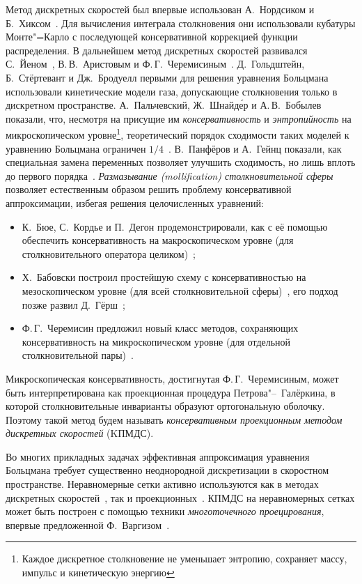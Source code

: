 Метод дискретных скоростей был впервые использован А.~Нордсиком и Б.~Хиксом~\autocite{Nordsieck1966}.
Для вычисления интеграла столкновения они использовали кубатуры Монте"=Карло
с последующей консервативной коррекцией функции распределения.
В дальнейшем метод дискретных скоростей развивался С.~Йеном~\autocite{Yen1984},
В.\,В.~Аристовым и Ф.\,Г.~Черемисиным~\autocite{Tcheremissine1980}.
Д.~Гольдштейн, Б.~Стёртевант и Дж.~Бродуелл первыми для решения уравнения Больцмана использовали
кинетические модели газа, допускающие столкновения только в дискретном пространстве.
А.~Пальчевский, Ж.~Шнайд\'{е}р и А.\,В.~Бобылев показали, что,
несмотря на присущие им \emph{консервативность} и \emph{энтропийность} на микроскопическом уровне\footnote{
    Каждое дискретное столкновение не уменьшает энтропию, сохраняет массу, импульс и кинетическую энергию},
теоретический порядок сходимости таких моделей к уравнению Больцмана ограничен \(1/4\)~\autocite{Palczewski1997}.
В.~Панфёров и А.~Гейнц показали, как специальная замена переменных
позволяет улучшить сходимость, но лишь вплоть до первого порядка~\autocite{Panferov2002}.
\emph{Размазывание (mollification) столкновительной сферы} позволяет естественным образом
решить проблему консервативной аппроксимации, избегая решения целочисленных уравнений:
\begin{itemize}
    \item К.~Бюе, С.~Кордье и П.~Дегон продемонстрировали, как с её помощью обеспечить консервативность
    на макроскопическом уровне (для столкновительного оператора целиком)~\autocite{Buet1998};
    \item Х.~Бабовски построил простейшую схему с консервативностью на мезоскопическом уровне
    (для всей столкновительной сферы)~\autocite{Babovsky1998}, его подход позже развил Д.~Гёрш~\autocite{Goersch2002};
    \item Ф.\,Г.~Черемисин предложил новый класс методов, сохраняющих консервативность
    на микроскопическом уровне (для отдельной столкновительной пары)~\autocite{Tcheremissine1997}.
\end{itemize}
Микроскопическая консервативность, достигнутая Ф.\,Г.~Черемисиным, может быть интерпретирована
как проекционная процедура Петрова"--~Галёркина,
в которой столкновительные инварианты образуют ортогональную оболочку.
Поэтому такой метод будем называть \emph{консервативным проекционным методом дискретных скоростей} (KПМДС).

Во многих прикладных задачах эффективная аппроксимация уравнения Больцмана
требует существенно неоднородной дискретизации в скоростном пространстве.
Неравномерные сетки активно используются
как в методах дискретных скоростей~\autocite{Kolobov2011, Morris2012},
так и проекционных~\autocite{Heintz2008, Wu2014}.
КПМДС на неравномерных сетках может быть построен с помощью техники \emph{многоточечного проецирования},
впервые предложенной Ф.~Варгизом~\autocite{Varghese2007}.


